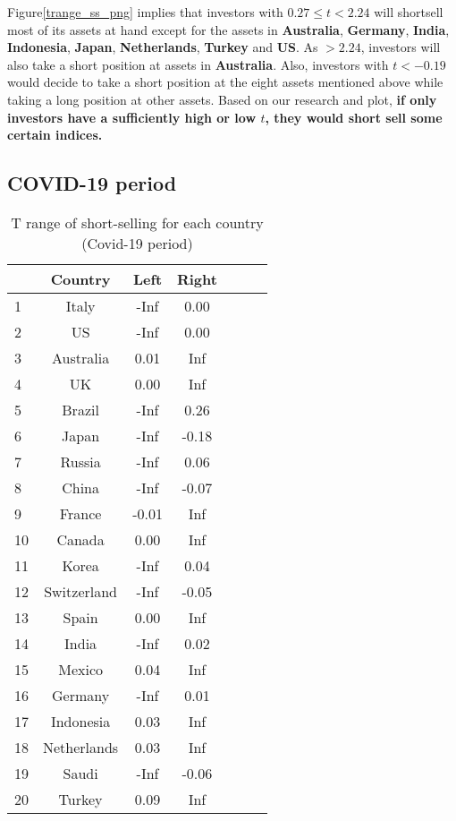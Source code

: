 \documentclass[
]{article}
\begin{document}
Figure\ref{trange_ss_png} implies that investors with
\(0.27\leq t < 2.24\) will shortsell most of its assets at hand except
for the assets in \textbf{Australia}, \textbf{Germany}, \textbf{India},
\textbf{Indonesia}, \textbf{Japan}, \textbf{Netherlands},
\textbf{Turkey} and \textbf{US}. As \(>2.24\), investors will also take
a short position at assets in \textbf{Australia}. Also, investors with
\(t<-0.19\) would decide to take a short position at the eight assets
mentioned above while taking a long position at other assets. Based on
our research and plot, \textbf{if only investors have a sufficiently
high or low \(t\), they would short sell some certain indices.}

\hypertarget{covid-19-period}{%
\subsection{COVID-19 period}\label{covid-19-period}}


\begin{table}[!htb]
\centering
{\begin{tabular}{lcccccc} 
  \hline
 & Country & Left & Right \\ 
  \hline
1 & Italy & -Inf & 0.00 \\ 
  2 & US & -Inf & 0.00 \\ 
  3 & Australia & 0.01 & Inf \\ 
  4 & UK & 0.00 & Inf \\ 
  5 & Brazil & -Inf & 0.26 \\ 
  6 & Japan & -Inf & -0.18 \\ 
  7 & Russia & -Inf & 0.06 \\ 
  8 & China & -Inf & -0.07 \\ 
  9 & France & -0.01 & Inf \\ 
  10 & Canada & 0.00 & Inf \\ 
  11 & Korea & -Inf & 0.04 \\ 
  12 & Switzerland & -Inf & -0.05 \\ 
  13 & Spain & 0.00 & Inf \\ 
  14 & India & -Inf & 0.02 \\ 
  15 & Mexico & 0.04 & Inf \\ 
  16 & Germany & -Inf & 0.01 \\ 
  17 & Indonesia & 0.03 & Inf \\ 
  18 & Netherlands & 0.03 & Inf \\ 
  19 & Saudi & -Inf & -0.06 \\ 
  20 & Turkey & 0.09 & Inf \\ 
   \hline
\end{tabular}
\caption{T range of short-selling for each country (Covid-19 period) }
}
\label{trange_co_table}
\end{table}
\end{document}
